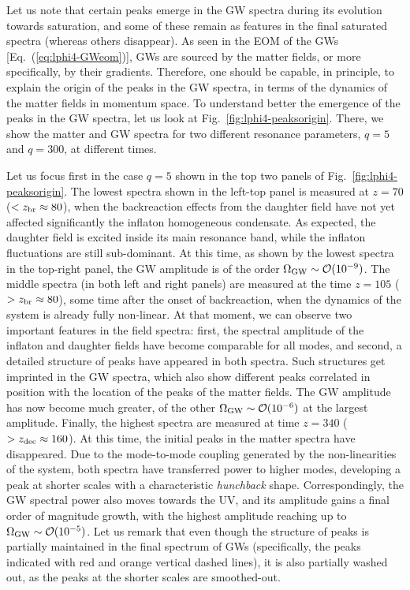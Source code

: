 \documentclass[a4paper,11pt]{article}
\begin{document}
Let us note that certain peaks emerge in the GW spectra during its evolution towards saturation, and some of these remain as features in the final saturated spectra (whereas others disappear). As seen in the EOM of the GWs [Eq.~(\ref{eq:lphi4-GWeom})], GWs are sourced by the matter fields, or more specifically, by their gradients. Therefore, one should be capable, in principle, to explain the origin of the peaks in the GW spectra, in terms of the dynamics of the matter fields in momentum space. To understand better the emergence of the peaks in the GW spectra, let us look at Fig.~\ref{fig:lphi4-peaksorigin}. There, we show the matter and GW spectra for two different resonance parameters, $q=5$ and $q=300$, at different times. 

Let us focus first in the case $q=5$ shown in the top two panels of Fig.~\ref{fig:lphi4-peaksorigin}. The lowest spectra shown in the left-top panel is measured at $z = 70$ ($< z_{\rm br} \approx 80$), when the backreaction effects from the daughter field have not yet affected significantly the inflaton homogeneous condensate. As expected, the daughter field is excited inside its main resonance band, while the inflaton fluctuations are still sub-dominant. At this time, as shown by the lowest spectra in the top-right panel, the GW amplitude is of the order $\Omega_{\rm GW} \sim \mathcal{O} (10^{-9})$. The middle spectra (in both left and right panels) are measured at the time $z = 105$ ($> z_{\rm br} \approx 80$), some time after the onset of backreaction, when the dynamics of the system is already fully non-linear. At that moment, we can observe two important features in the field spectra: first, the spectral amplitude of the inflaton and daughter fields have become comparable for all modes, and second, a detailed structure of peaks have appeared in both spectra. Such structures get imprinted in the GW spectra, which also show different peaks correlated in position with the location of the peaks of the matter fields. The GW amplitude has now become much greater, of the other $\Omega_{\rm GW} \sim \mathcal{O} (10^{-6})$ at the largest amplitude. Finally, the highest spectra are measured at time $z = 340$ ($> z_{\rm dec} \approx 160$). At this time, the initial peaks in the matter spectra have disappeared. Due to the mode-to-mode coupling generated by the non-linearities of the system, both spectra have transferred power to higher modes, developing a peak at shorter scales with a characteristic \textit{hunchback} shape. Correspondingly, the GW spectral power also moves towards the UV, and its amplitude gains a final order of magnitude growth, with the highest amplitude reaching up to $\Omega_{\rm GW} \sim \mathcal{O} (10^{-5})$. Let us remark that even though the structure of peaks is partially maintained in the final spectrum of GWs (specifically, the peaks indicated with red and orange vertical dashed lines), it is also partially washed out, as the peaks at the shorter scales are smoothed-out. 
 
\end{document}
